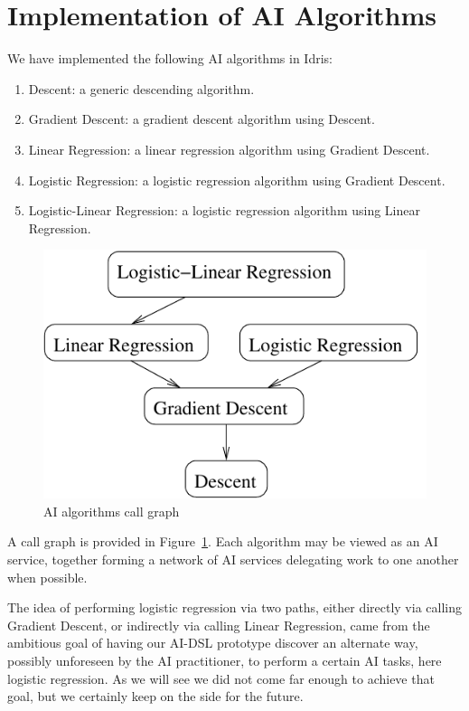 \documentclass[]{report}
\begin{document}
\section{Implementation of AI Algorithms}
We have implemented the following AI algorithms in Idris:
\begin{enumerate}
\item Descent: a generic descending algorithm.
\item Gradient Descent: a gradient descent algorithm using Descent.
\item Linear Regression: a linear regression algorithm using Gradient
  Descent.
\item Logistic Regression: a logistic regression algorithm using
  Gradient Descent.
\item Logistic-Linear Regression: a logistic regression algorithm
  using Linear Regression.
\end{enumerate}
\begin{figure}[H]
  \centering
  \includegraphics[scale=0.8]{figs/ai-algorithms.xfig.pdf}
  \caption{AI algorithms call graph}
  \label{fig:ai_algorithms}
\end{figure}
A call graph is provided in Figure~\ref{fig:ai_algorithms}.  Each
algorithm may be viewed as an AI service, together forming a network
of AI services delegating work to one another when possible.

The idea of performing logistic regression via two paths, either
directly via calling Gradient Descent, or indirectly via calling
Linear Regression, came from the ambitious goal of having our AI-DSL
prototype discover an alternate way, possibly unforeseen by the AI
practitioner, to perform a certain AI tasks, here logistic regression.
As we will see we did not come far enough to achieve that goal, but we
certainly keep on the side for the future.
\end{document}
